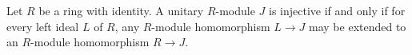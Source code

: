 Let $R$ be a ring with identity. A unitary $R$-module $J$ is injective if and only if for every left ideal $L$ of $R$, any $R$-module homomorphism $L \to J$ may be extended to an $R$-module homomorphism $R \to J$.

